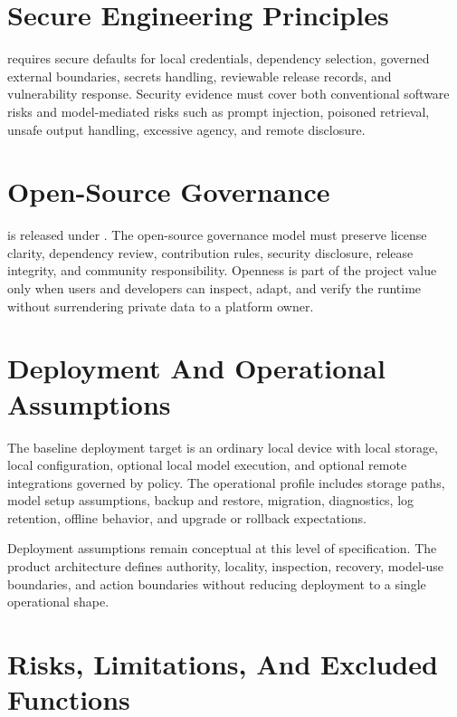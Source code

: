 
\section{Secure Engineering Principles}

\Madre requires secure defaults for local credentials, dependency selection, governed external boundaries, secrets handling, reviewable release records, and vulnerability response. Security evidence must cover both conventional software risks and model-mediated risks such as prompt injection, poisoned retrieval, unsafe output handling, excessive agency, and remote disclosure.

\section{Open-Source Governance}

\Madre is released under \texttt{\license}. The open-source governance model must preserve license clarity, dependency review, contribution rules, security disclosure, release integrity, and community responsibility. Openness is part of the project value only when users and developers can inspect, adapt, and verify the runtime without surrendering private data to a platform owner.

\section{Deployment And Operational Assumptions}

The baseline deployment target is an ordinary local device with local storage, local configuration, optional local model execution, and optional remote integrations governed by policy. The operational profile includes storage paths, model setup assumptions, backup and restore, migration, diagnostics, log retention, offline behavior, and upgrade or rollback expectations.

Deployment assumptions remain conceptual at this level of specification. The product architecture defines authority, locality, inspection, recovery, model-use boundaries, and action boundaries without reducing deployment to a single operational shape.

\section{Risks, Limitations, And Excluded Functions}

